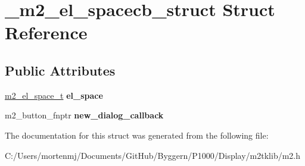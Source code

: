\hypertarget{struct__m2__el__spacecb__struct}{\section{\-\_\-m2\-\_\-el\-\_\-spacecb\-\_\-struct Struct Reference}
\label{struct__m2__el__spacecb__struct}
}
\subsection*{Public Attributes}
\begin{DoxyCompactItemize}
\item 
\hypertarget{struct__m2__el__spacecb__struct_a7aff6771003dd8b587d42623c1832793}{\hyperlink{struct__m2__el__space__struct}{m2\-\_\-el\-\_\-space\-\_\-t} {\bfseries el\-\_\-space}}\label{struct__m2__el__spacecb__struct_a7aff6771003dd8b587d42623c1832793}

\item 
\hypertarget{struct__m2__el__spacecb__struct_a2568e54574427311551feee143caf7c7}{m2\-\_\-button\-\_\-fnptr {\bfseries new\-\_\-dialog\-\_\-callback}}\label{struct__m2__el__spacecb__struct_a2568e54574427311551feee143caf7c7}

\end{DoxyCompactItemize}


The documentation for this struct was generated from the following file\-:\begin{DoxyCompactItemize}
\item 
C\-:/\-Users/mortenmj/\-Documents/\-Git\-Hub/\-Byggern/\-P1000/\-Display/m2tklib/m2.\-h\end{DoxyCompactItemize}
